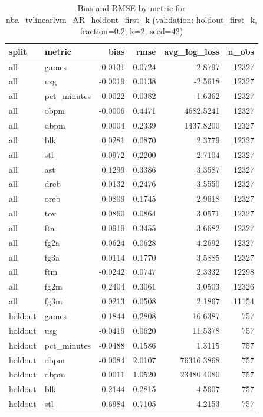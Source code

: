 \begin{table}
\caption{Bias and RMSE by metric for nba_tvlinearlvm_AR_holdout_first_k (validation: holdout_first_k, fraction=0.2, k=2, seed=42)}
\label{tab:nba_tvlinearlvm_AR_holdout_first_k_vs_holdout_first_k_f20_k2_s42_bias_rmse}
\begin{tabular}{llrrrr}
\toprule
split & metric & bias & rmse & avg\_log\_loss & n\_obs \\
\midrule
all & games & -0.0131 & 0.0724 & 2.8797 & 12327 \\
all & usg & -0.0019 & 0.0138 & -2.5618 & 12327 \\
all & pct\_minutes & -0.0022 & 0.0382 & -1.6362 & 12327 \\
all & obpm & -0.0006 & 0.4471 & 4682.5241 & 12327 \\
all & dbpm & 0.0004 & 0.2339 & 1437.8200 & 12327 \\
all & blk & 0.0281 & 0.0870 & 2.3779 & 12327 \\
all & stl & 0.0972 & 0.2200 & 2.7104 & 12327 \\
all & ast & 0.1299 & 0.3386 & 3.3587 & 12327 \\
all & dreb & 0.0132 & 0.2476 & 3.5550 & 12327 \\
all & oreb & 0.0809 & 0.1745 & 2.9618 & 12327 \\
all & tov & 0.0860 & 0.0864 & 3.0571 & 12327 \\
all & fta & 0.0919 & 0.3455 & 3.6682 & 12327 \\
all & fg2a & 0.0624 & 0.0628 & 4.2692 & 12327 \\
all & fg3a & 0.0114 & 0.1770 & 3.5885 & 12327 \\
all & ftm & -0.0242 & 0.0747 & 2.3332 & 12298 \\
all & fg2m & 0.2404 & 0.3061 & 3.0503 & 12326 \\
all & fg3m & 0.0213 & 0.0508 & 2.1867 & 11154 \\
holdout & games & -0.1844 & 0.2808 & 16.6387 & 757 \\
holdout & usg & -0.0419 & 0.0620 & 11.5378 & 757 \\
holdout & pct\_minutes & -0.0488 & 0.1586 & 1.3115 & 757 \\
holdout & obpm & -0.0084 & 2.0107 & 76316.3868 & 757 \\
holdout & dbpm & 0.0011 & 1.0520 & 23480.4080 & 757 \\
holdout & blk & 0.2144 & 0.2815 & 4.5607 & 757 \\
holdout & stl & 0.6984 & 0.7105 & 4.2153 & 757 \\

\end{tabular}
\end{table}
